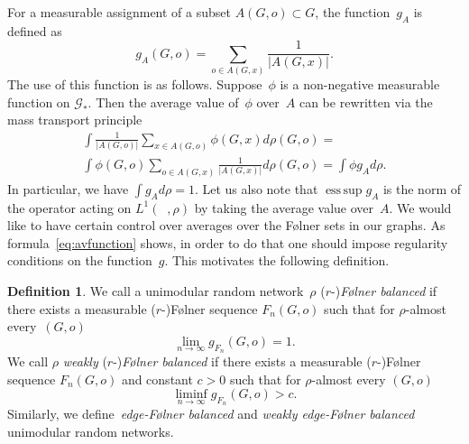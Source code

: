 \documentclass[english]{article}
\theoremstyle{definition}
\newtheorem{definition}[lemma]{Definition}
\DeclareMathOperator{\esssup}{ess\,sup} %
\DeclareMathOperator{\Gr}{{\mathcal{G}_*}}
\begin{document}
For a measurable assignment of a subset $A(G,o) \subset G$, the function~$g_A$ is defined as
\begin{equation}\label{definition:g_function}
    g_A(G,o) = \sum\limits_{o \in A(G, x)} \frac{1}{|A(G,x)|}.
\end{equation}
The use of this function is as follows. Suppose~$\phi$ is a non-negative measurable function on $\mathcal{G_*}$. Then the average value of~$\phi$ over~$A$ can be rewritten via the mass transport principle 
\begin{multline}\label{eq:avfunction}
    \int \frac{1}{|A(G,o)|} \sum_{x \in A(G,o)} \phi(G,x) d\rho(G,o) = \\ \int \phi(G,o) \sum_{o \in A(G,x)} \frac{1}{|A(G,x)|} d\rho(G,o) = \int \phi g_A d\rho.
\end{multline}
In particular, we have $\int g_A d \rho= 1$. Let us also note that $\esssup g_A$ is the norm of the operator acting on $L^1(\Gr, \rho)$ by taking the average value over~$A$. We would like to have certain control over averages over the F\o lner sets in our graphs. As formula~\eqref{eq:avfunction} shows,  in order to do that one should impose regularity conditions on the function~$g$. This motivates the following definition.
\begin{definition}
    We call a unimodular random network~$\rho$ ($r$-)\emph{{F\o lner} balanced} if there exists a measurable ($r$-)F\o lner sequence $F_n(G,o)$ such that for $\rho$-almost every~$(G,o)$
    $$
    \lim_{n \to \infty} g_{F_n}(G,o)  = 1. 
    $$
    We call $\rho$ \emph{weakly} ($r$-)\emph{{F\o lner} balanced} if there exists a measurable ($r$-)F\o lner sequence $F_n(G,o)$ and constant $c > 0$ such that for $\rho$-almost every $(G,o)$ 
    $$
     \liminf_{n\to \infty}g_{F_n}(G,o) > c. 
    $$  
     Similarly, we define~\emph{edge-{F\o lner} balanced} and \emph{weakly edge-{F\o lner} balanced} unimodular random networks.
\end{definition}
   
\end{document}
